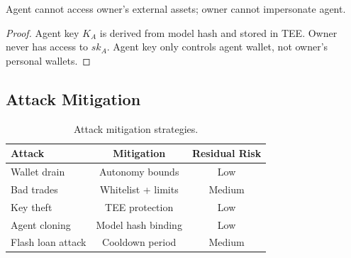 \begin{theorem}
Agent cannot access owner's external assets; owner cannot impersonate agent.
\end{theorem}

\begin{proof}
Agent key $K_A$ is derived from model hash and stored in TEE. Owner never has access to $sk_A$. Agent key only controls agent wallet, not owner's personal wallets.
\end{proof}

\subsection{Attack Mitigation}

\begin{table}[t]
\centering
\begin{tabular}{lcc}
\toprule
\textbf{Attack} & \textbf{Mitigation} & \textbf{Residual Risk} \\
\midrule
Wallet drain & Autonomy bounds & Low \\
Bad trades & Whitelist + limits & Medium \\
Key theft & TEE protection & Low \\
Agent cloning & Model hash binding & Low \\
Flash loan attack & Cooldown period & Medium \\
\bottomrule
\end{tabular}
\caption{Attack mitigation strategies.}
\label{tab:attacks}
\end{table}

